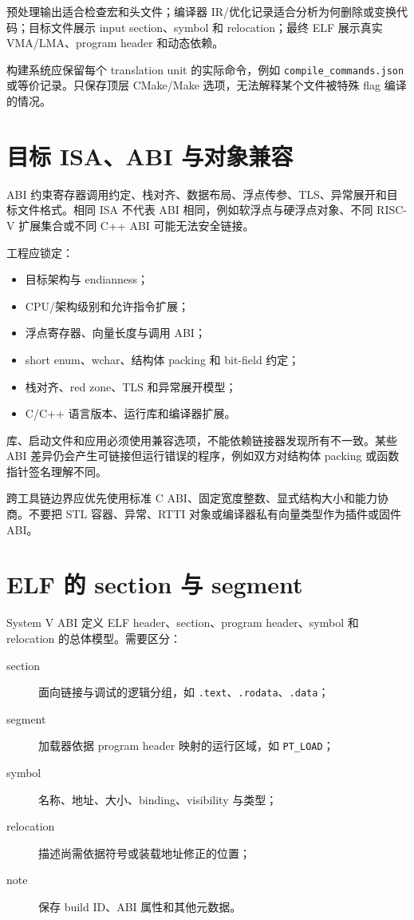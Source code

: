 预处理输出适合检查宏和头文件；编译器 IR/优化记录适合分析为何删除或变换代码；目标文件展示 input section、symbol 和 relocation；最终 ELF 展示真实 VMA/LMA、program header 和动态依赖。

构建系统应保留每个 translation unit 的实际命令，例如 \texttt{compile\_commands.json} 或等价记录。只保存顶层 CMake/Make 选项，无法解释某个文件被特殊 flag 编译的情况。

\section{目标 ISA、ABI 与对象兼容}

ABI 约束寄存器调用约定、栈对齐、数据布局、浮点传参、TLS、异常展开和目标文件格式。相同 ISA 不代表 ABI 相同，例如软浮点与硬浮点对象、不同 RISC-V 扩展集合或不同 C++ ABI 可能无法安全链接。

工程应锁定：

\begin{itemize}
  \item 目标架构与 endianness；
  \item CPU/架构级别和允许指令扩展；
  \item 浮点寄存器、向量长度与调用 ABI；
  \item short enum、wchar、结构体 packing 和 bit-field 约定；
  \item 栈对齐、red zone、TLS 和异常展开模型；
  \item C/C++ 语言版本、运行库和编译器扩展。
\end{itemize}

库、启动文件和应用必须使用兼容选项，不能依赖链接器发现所有不一致。某些 ABI 差异仍会产生可链接但运行错误的程序，例如双方对结构体 packing 或函数指针签名理解不同。

跨工具链边界应优先使用标准 C ABI、固定宽度整数、显式结构大小和能力协商。不要把 STL 容器、异常、RTTI 对象或编译器私有向量类型作为插件或固件 ABI。

\section{ELF 的 section 与 segment}

System V ABI 定义 ELF header、section、program header、symbol 和 relocation 的总体模型\cite{system-v-abi}。需要区分：

\begin{description}
  \item[section] 面向链接与调试的逻辑分组，如 \texttt{.text}、\texttt{.rodata}、\texttt{.data}；
  \item[segment] 加载器依据 program header 映射的运行区域，如 \texttt{PT\_LOAD}；
  \item[symbol] 名称、地址、大小、binding、visibility 与类型；
  \item[relocation] 描述尚需依据符号或装载地址修正的位置；
  \item[note] 保存 build ID、ABI 属性和其他元数据。
\end{description}

